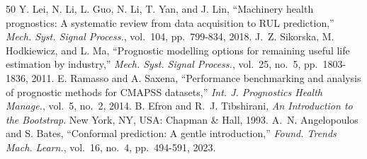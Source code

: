 \documentclass[journal,10pt,twocolumn]{IEEEtran}
\begin{document}
\begin{thebibliography}{50}
Y. Lei, N. Li, L. Guo, N. Li, T. Yan, and J. Lin, ``Machinery health prognostics: A systematic review from data acquisition to RUL prediction,'' \emph{Mech. Syst. Signal Process.}, vol.\ 104, pp.\ 799-834, 2018.
J.~Z. Sikorska, M. Hodkiewicz, and L. Ma, ``Prognostic modelling options for remaining useful life estimation by industry,'' \emph{Mech. Syst. Signal Process.}, vol.\ 25, no.\ 5, pp.\ 1803-1836, 2011.
E. Ramasso and A. Saxena, ``Performance benchmarking and analysis of prognostic methods for CMAPSS datasets,'' \emph{Int. J. Prognostics Health Manage.}, vol.\ 5, no.\ 2, 2014.
B. Efron and R.~J. Tibshirani, \emph{An Introduction to the Bootstrap}. New York, NY, USA: Chapman \& Hall, 1993.
A.~N. Angelopoulos and S. Bates, ``Conformal prediction: A gentle introduction,'' \emph{Found. Trends Mach. Learn.}, vol.\ 16, no.\ 4, pp.\ 494-591, 2023.
\end{thebibliography}
\end{document}
